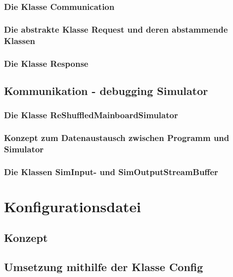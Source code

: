 \subsubsection{Die Klasse Communication}
\subsubsection{Die abstrakte Klasse Request und deren abstammende Klassen}
\subsubsection{Die Klasse Response}

\subsection{Kommunikation - debugging Simulator}

\subsubsection{Die Klasse ReShuffledMainboardSimulator}
\subsubsection{Konzept zum Datenaustausch zwischen Programm und Simulator}
\subsubsection{Die Klassen SimInput- und SimOutputStreamBuffer}

\section{Konfigurationsdatei}
\label{sec:config}
\subsection{Konzept}
\subsection{Umsetzung mithilfe der Klasse Config}
